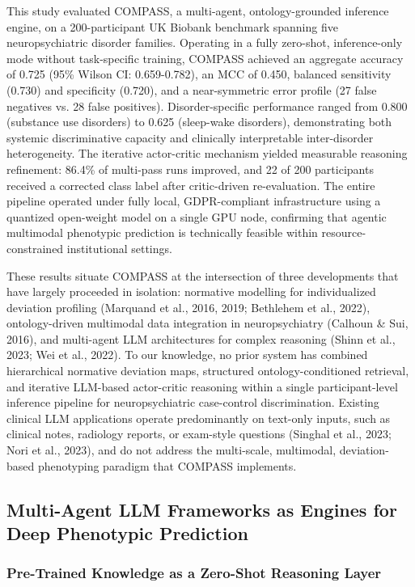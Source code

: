 \documentclass[11pt,a4paper,twoside]{article}
\begin{document}
This study evaluated COMPASS, a multi-agent, ontology-grounded inference engine, on a 200-participant UK Biobank benchmark spanning five neuropsychiatric disorder families. Operating in a fully zero-shot, inference-only mode without task-specific training, COMPASS achieved an aggregate accuracy of 0.725 (95\% Wilson CI: 0.659-0.782), an MCC of 0.450, balanced sensitivity (0.730) and specificity (0.720), and a near-symmetric error profile (27 false negatives vs. 28 false positives). Disorder-specific performance ranged from 0.800 (substance use disorders) to 0.625 (sleep-wake disorders), demonstrating both systemic discriminative capacity and clinically interpretable inter-disorder heterogeneity. The iterative actor-critic mechanism yielded measurable reasoning refinement: 86.4\% of multi-pass runs improved, and 22 of 200 participants received a corrected class label after critic-driven re-evaluation. The entire pipeline operated under fully local, GDPR-compliant infrastructure using a quantized open-weight model on a single GPU node, confirming that agentic multimodal phenotypic prediction is technically feasible within resource-constrained institutional settings.

These results situate COMPASS at the intersection of three developments that have largely proceeded in isolation: normative modelling for individualized deviation profiling (Marquand et al., 2016, 2019; Bethlehem et al., 2022), ontology-driven multimodal data integration in neuropsychiatry (Calhoun \& Sui, 2016), and multi-agent LLM architectures for complex reasoning (Shinn et al., 2023; Wei et al., 2022). To our knowledge, no prior system has combined hierarchical normative deviation maps, structured ontology-conditioned retrieval, and iterative LLM-based actor-critic reasoning within a single participant-level inference pipeline for neuropsychiatric case-control discrimination. Existing clinical LLM applications operate predominantly on text-only inputs, such as clinical notes, radiology reports, or exam-style questions (Singhal et al., 2023; Nori et al., 2023), and do not address the multi-scale, multimodal, deviation-based phenotyping paradigm that COMPASS implements.

\subsection{Multi-Agent LLM Frameworks as Engines for Deep Phenotypic Prediction}

\subsubsection{Pre-Trained Knowledge as a Zero-Shot Reasoning Layer}
\end{document}
